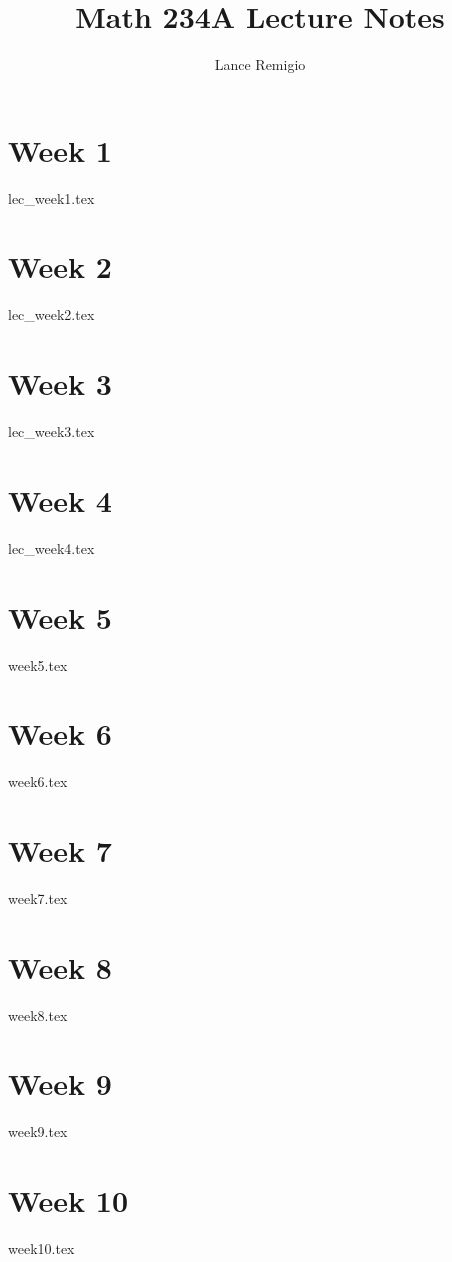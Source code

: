 \documentclass[a4paper]{report}
\title{Math 234A Lecture Notes}
\author{Lance Remigio}
\begin{document}
\maketitle    
\tableofcontents

\chapter{Week 1}

{lec_week1.tex}

\chapter{Week 2}

{lec_week2.tex}

\chapter{Week 3}

{lec_week3.tex}

\chapter{Week 4}

{lec_week4.tex}

\chapter{Week 5}

{week5.tex}

\chapter{Week 6}

{week6.tex}

\chapter{Week 7}

{week7.tex}

\chapter{Week 8}

{week8.tex}

\chapter{Week 9}

{week9.tex}

\chapter{Week 10}

{week10.tex}
\end{document}
